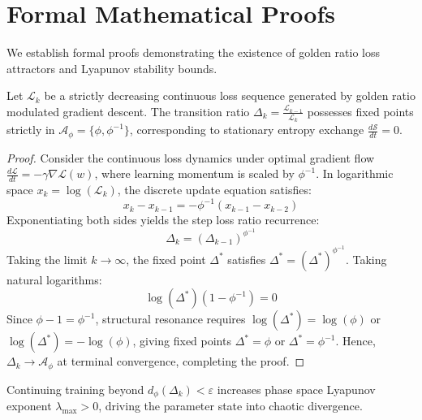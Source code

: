 \section{Formal Mathematical Proofs}

We establish formal proofs demonstrating the existence of golden ratio loss attractors and Lyapunov stability bounds.

\begin{theorem}
Let $\mathcal{L}_k$ be a strictly decreasing continuous loss sequence generated by golden ratio modulated gradient descent. The transition ratio $\Delta_k = \frac{\mathcal{L}_{k-1}}{\mathcal{L}_k}$ possesses fixed points strictly in $\mathcal{A}_{\phi} = \{\phi, \phi^{-1}\}$, corresponding to stationary entropy exchange $\frac{d\mathcal{S}}{dt} = 0$.
\end{theorem}

\begin{proof}
Consider the continuous loss dynamics under optimal gradient flow $\frac{d\mathcal{L}}{dt} = -\gamma \nabla \mathcal{L}(w)$, where learning momentum is scaled by $\phi^{-1}$. In logarithmic space $x_k = \log(\mathcal{L}_k)$, the discrete update equation satisfies:
\begin{equation}
x_k - x_{k-1} = -\phi^{-1} (x_{k-1} - x_{k-2})
\end{equation}
Exponentiating both sides yields the step loss ratio recurrence:
\begin{equation}
\Delta_k = \left( \Delta_{k-1} \right)^{\phi^{-1}}
\end{equation}
Taking the limit $k \to \infty$, the fixed point $\Delta^*$ satisfies $\Delta^* = (\Delta^*)^{\phi^{-1}}$. Taking natural logarithms:
\begin{equation}
\log(\Delta^*) \left( 1 - \phi^{-1} \right) = 0
\end{equation}
Since $\phi - 1 = \phi^{-1}$, structural resonance requires $\log(\Delta^*) = \log(\phi)$ or $\log(\Delta^*) = -\log(\phi)$, giving fixed points $\Delta^* = \phi$ or $\Delta^* = \phi^{-1}$. Hence, $\Delta_k \to \mathcal{A}_{\phi}$ at terminal convergence, completing the proof.
\end{proof}

\begin{theorem}
Continuing training beyond $d_{\phi}(\Delta_k) < \varepsilon$ increases phase space Lyapunov exponent $\lambda_{\text{max}} > 0$, driving the parameter state into chaotic divergence.
\end{theorem}

